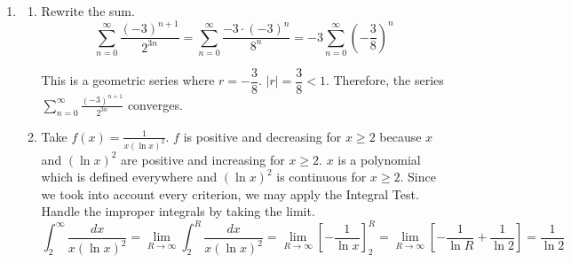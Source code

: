 \documentclass[a4paper, 12pt]{article}
\begin{document}
\begin{enumerate}[leftmargin=*,label=\textbf{\arabic*.}]
\begin{enumerate}[leftmargin=*,label=\textbf{\alph*.}]
We have
\[\boxed{A=\frac{\pi\left(9-2\sqrt3\right)}{36}+\frac12\cdot\ln\frac23-\frac{\sqrt3\ln\sqrt3+\sqrt3-3}3}.\]

\item\leavevmode
\vspace{-2em}
\begin{align*}
\boxed{\begin{array}{l}
\displaystyle\int_{-\ln\sqrt3}^0\pi\left[\left( e^y\right)^2-\left(\frac1{\sqrt3}\right)^2\right]\,dy
+\int_0^{\pi/6}\pi\left[(1)^2-\left(\frac1{\sqrt3}\right)^2\right]\,dy\\[1em]
\displaystyle+\int_{\pi/6}^{\pi/4}\pi\left[(1^2)-\left(\tan y\right)^2\right]\,dy
\end{array}}
\end{align*}

\newpage
\item\leavevmode
\vspace{-2em}
\begin{align*}
\boxed{\begin{array}{l}
\displaystyle\int_{-\ln\sqrt3}^02\pi\left(2-y\right)\left( e^y-\frac1{\sqrt3}\right)\,dy
+\int_0^{\pi/6}2\pi\left(2-y\right)\left(1-\frac1{\sqrt3}\right)\,dy\\[1em]
\displaystyle+\int_{\pi/6}^{\pi/4}2\pi\left(2-y\right)\left(1-\tan y\right)\,dy
\end{array}}
\end{align*}
\end{enumerate}

\item \begin{enumerate}[leftmargin=*,label=\textbf{\alph*.}]
\item Rewrite the sum.
\[\sum_{n=0}^{\infty}\frac{(-3)^{n+1}}{2^{3n}}
=\sum_{n=0}^{\infty}\frac{-3\cdot(-3)^n}{8^n}
=-3\sum_{n=0}^{\infty}\left(-\frac38\right)^n\]

This is a geometric series where $r=-\dfrac38$. $|r|=\dfrac38<1$. Therefore, the series $\displaystyle\sum_{n=0}^{\infty}\frac{(-3)^{n+1}}{2^{3n}}$ converges.

\item Take $\displaystyle f(x)=\frac1{x(\ln x)^2}$. $f$ is positive and decreasing for $x\geq2$ because $x$ and $(\ln x)^2$ are positive and increasing for $x\geq2$. $x$ is a polynomial which is defined everywhere and $(\ln x)^2$ is continuous for $x\geq2$. Since we took into account every criterion, we may apply the Integral Test. Handle the improper integrals by taking the limit.
\[\int_2^{\infty}\frac{dx}{x(\ln x)^2}
=\lim_{R\to\infty}\int_2^R\frac{dx}{x(\ln x)^2}
=\lim_{R\to\infty}\left[-\frac1{\ln x}\right]_2^R
=\lim_{R\to\infty}\left[-\frac1{\ln R}+\frac1{\ln2}\right]
=\frac1{\ln 2}\]


\end{enumerate}
\end{enumerate}
\end{document}
